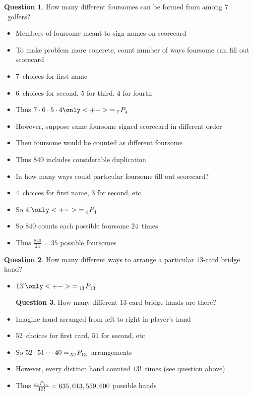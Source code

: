 \documentclass{beamer}
\theoremstyle{definition}
\newtheorem{question}{Question}
\newcommand\npr[2]{\tensor[_{#1}]P{_{#2}}}
\begin{document}
\begin{frame}
\begin{question}
How many different foursomes can be formed
from among $7$~golfers?
\end{question}
\begin{itemize}
\item Members of foursome meant to sign names on scorecard
\item To make problem more concrete,
count number of ways foursome can fill out scorecard
\item $7$~choices for first name
\item $6$~choices for second, $5$ for third, $4$ for fourth
\item Thus $7\cdot 6\cdot 5\cdot 4
\only<+->{=\npr{7}{4}}$
\end{itemize}
\end{frame}
\begin{frame}
\begin{itemize}
\item However, suppose same foursome signed scorecard in different order
\item Then foursome would be counted as \alert{different foursome}
\item Thus $840$ includes considerable duplication
\item In how many ways could particular foursome fill out scorecard?
\item $4$~choices for first name, $3$ for second, etc
\item So $4!\only<+->{=\npr{4}{4}}$
\item So $840$ counts each possible foursome $24$~times 
\item Thus $\frac{840}{24}=35$ possible foursomes
\end{itemize}
\end{frame}

\begin{frame}
\begin{question}
How many different ways to arrange a particular $13$-card
bridge hand?
\end{question}
\begin{itemize}
\item $13!\only<+->{=\npr{13}{13}}$
\begin{question}
How many different $13$-card bridge hands are there?
\end{question}
\item Imagine hand arranged from left to right in player's hand
\item $52$~choices for first card, $51$ for second, etc
\item So $52\cdot 51\cdots 40=\npr{52}{13}$ arrangements
\item However, every distinct hand counted $13!$~times (see question above)
\item Thus $\frac{\npr{52}{13}}{13!}
=635,013,559,600$ possible hands
\end{itemize}
\end{frame}
\end{document}
